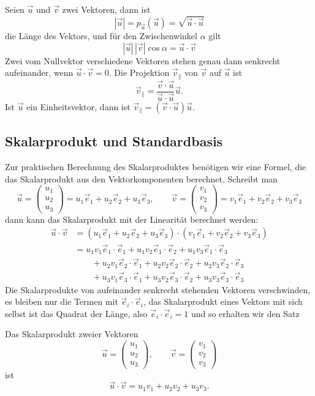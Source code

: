 \begin{satz}
Seien $\vec u$ und $\vec v$ zwei Vektoren, dann ist
\[
|\vec u|=p_{\vec u}(\vec u)=\sqrt{\vec u\cdot\vec u}
\]
die Länge des Vektors, und für den Zwischenwinkel $\alpha$ gilt
\[
|\vec u|\,|\vec v|\cos\alpha=\vec u\cdot\vec v
\]
Zwei vom Nullvektor verschiedene Vektoren  stehen genau dann senkrecht
aufeinander, wenn $\vec u\cdot\vec v=0$.
Die Projektion $\vec v_{\|}$ von $\vec v$ auf $\vec u$ ist
\[
\vec v_{\|}=\frac{\vec v\cdot\vec u}{\vec u\cdot\vec u}\vec u.
\]
Ist $\vec u$ ein Einheitsvektor, dann ist $\vec v_{\|}=(\vec v\cdot \vec u)\vec u$.
\end{satz}

%
%
\subsection{Skalarprodukt und Standardbasis}
Zur praktischen Berechnung des Skalarproduktes benötigen wir
eine Formel, die das Skalarprodukt aus den Vektorkomponenten
berechnet.
Schreibt man
\[
\vec u=\begin{pmatrix}u_1\\u_2\\u_3\end{pmatrix}
=u_1\vec e_1+u_2\vec e_2+u_3\vec e_3
,
\qquad
\vec v=\begin{pmatrix}v_1\\v_2\\v_3\end{pmatrix}
=v_1\vec e_1+v_2\vec e_2+v_3\vec e_3
\]
dann kann das Skalarprodukt mit der Linearität berechnet werden:
\begin{align*}
\vec u\cdot\vec v
&=
(u_1\vec e_1+u_2\vec e_2+u_3\vec e_3)\cdot
(v_1\vec e_1+v_2\vec e_2+v_3\vec e_3)
\\
&=
u_1v_1\vec e_1\cdot\vec e_1+
u_1v_2\vec e_1\cdot\vec e_2+
u_1v_3\vec e_1\cdot\vec e_3\\
&\qquad +
u_2v_1\vec e_2\cdot\vec e_1+
u_2v_2\vec e_2\cdot\vec e_2+
u_2v_3\vec e_2\cdot\vec e_3\\
&\qquad+
u_3v_1\vec e_3\cdot\vec e_1+
u_3v_2\vec e_3\cdot\vec e_2+
u_3v_3\vec e_3\cdot\vec e_3
\end{align*}
Die Skalarprodukte von aufeinander senkrecht stehenden Vektoren
verschwinden, es bleiben nur die Termen mit $\vec e_i\cdot\vec e_i$,
das Skalarprodukt eines Vektors mit sich selbst ist das Quadrat
der Länge, also $\vec e_i\cdot \vec e_i=1$ und so erhalten wir den
Satz
\begin{satz}
Das Skalarprodukt zweier Vektoren
\[
\vec u=\begin{pmatrix}u_1\\u_2\\u_3\end{pmatrix},
\qquad
\vec v=\begin{pmatrix}v_1\\v_2\\v_3\end{pmatrix}
\]
ist
\[
\vec u\cdot\vec v
=
u_1v_1+u_2v_2+u_3v_3.
\]
\end{satz}

